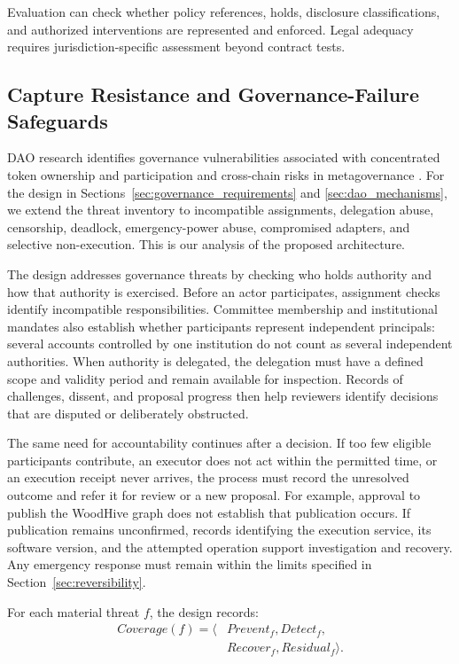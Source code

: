 \documentclass[journal]{IEEEtran}
\begin{document}
Evaluation can check whether policy references, holds,
disclosure classifications, and authorized interventions
are represented and enforced. Legal adequacy requires
jurisdiction-specific assessment beyond contract tests.

\subsection{Capture Resistance and Governance-Failure Safeguards}
\label{sec:resilience}

DAO research identifies governance vulnerabilities associated
with concentrated token ownership \cite{Han2025DAOReview}
and participation and cross-chain risks in metagovernance
\cite{Weidener2026Metagovernance}.
For the design in Sections~\ref{sec:governance_requirements}
and \ref{sec:dao_mechanisms}, we extend the threat inventory
to incompatible assignments, delegation abuse, censorship,
deadlock, emergency-power abuse, compromised adapters,
and selective non-execution. This is our analysis of the
proposed architecture.

The design addresses governance threats by checking who
holds authority and how that authority is exercised.
Before an actor participates, assignment checks identify
incompatible responsibilities. Committee membership and
institutional mandates also establish whether participants
represent independent principals: several accounts controlled
by one institution do not count as several independent
authorities. When authority is delegated, the delegation
must have a defined scope and validity period and remain
available for inspection. Records of challenges, dissent,
and proposal progress then help reviewers identify decisions
that are disputed or deliberately obstructed.

The same need for accountability continues after a decision.
If too few eligible participants contribute, an executor
does not act within the permitted time, or an execution
receipt never arrives, the process must record the unresolved
outcome and refer it for review or a new proposal. For
example, approval to publish the WoodHive graph does not
establish that publication occurs. If publication remains
unconfirmed, records identifying the execution service,
its software version, and the attempted operation support
investigation and recovery. Any emergency response must
remain within the limits specified in
Section~\ref{sec:reversibility}.

For each material threat $f$, the design records:
\begin{equation}
\label{eq:threat_coverage}
\begin{aligned}
Coverage(f)=\langle&
Prevent_f,Detect_f,\\
&Recover_f,Residual_f\rangle.
\end{aligned}
\end{equation}
\end{document}
